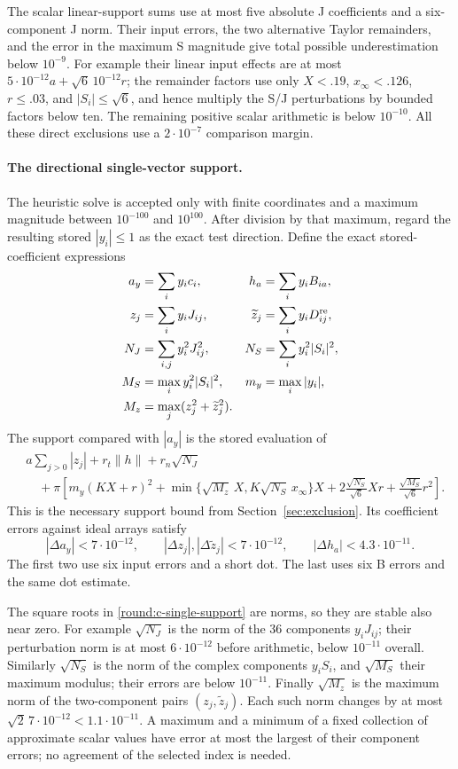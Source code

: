 The scalar linear-support sums use at most five absolute J
coefficients and a six-component J norm.
Their input errors, the two alternative Taylor remainders, and
the error in the maximum S magnitude give total possible
underestimation below $10^{-9}$.
For example their linear input effects are at most
$5\cdot10^{-12}a+\sqrt6\,10^{-12}r$; the remainder factors
use only $X<.19$, $x_\infty<.126$, $r\le.03$, and
$|S_i|\le\sqrt6$, and hence multiply the S/J perturbations by
bounded factors below ten.
The remaining positive scalar arithmetic is below $10^{-10}$.
All these direct exclusions use a $2\cdot10^{-7}$ comparison margin.

\paragraph{The directional single-vector support.}
The heuristic solve is accepted only with finite coordinates and a
maximum magnitude between $10^{-100}$ and $10^{100}$.
After division by that maximum, regard the resulting stored
$|y_i|\le1$ as the exact test direction.
Define the exact stored-coefficient expressions
\[
 \begin{aligned}
 a_y&=\sum_i y_i c_i,& h_a&=\sum_i y_iB_{ia},\\
 z_j&=\sum_i y_iJ_{ij},&
 \widetilde z_j&=\sum_i y_iD_{ij}^{\rm re},\\
 N_J&=\sum_{i,j}y_i^2J_{ij}^2,& N_S&=\sum_i y_i^2|S_i|^2,\\
 M_S&=\max_i y_i^2|S_i|^2,& m_y&=\max_i|y_i|,\\
 M_z&=\max_j(z_j^2+\widetilde z_j^2).
 \end{aligned}
\]
The support compared with $|a_y|$ is the stored evaluation of
\begin{align}
 &a\sum_{j>0}|z_j|+r_t\|h\|+r_n\sqrt{N_J}\nonumber\\
 &\quad+\pi\left[
 m_y(KX+r)^2+
 \min\{\sqrt{M_z}\,X,K\sqrt{N_S}\,x_\infty\}X
 +2\frac{\sqrt{N_S}}{\sqrt6}Xr
 +\frac{\sqrt{M_S}}{\sqrt6}r^2
 \right].\label{round:c-single-support}
\end{align}
This is the necessary support bound from
Section~\ref{sec:exclusion}.
Its coefficient errors against ideal arrays satisfy
\[
 |\Delta a_y|<7\cdot10^{-12},\qquad
 |\Delta z_j|,|\Delta\widetilde z_j|<7\cdot10^{-12},\qquad
 |\Delta h_a|<4.3\cdot10^{-11}.
 \]
The first two use six input errors and a short dot.
The last uses six B errors and the same dot estimate.

The square roots in \eqref{round:c-single-support} are norms, so
they are stable also near zero.
For example $\sqrt{N_J}$ is the norm of the 36 components
$y_iJ_{ij}$; their perturbation norm is at most
$6\cdot10^{-12}$ before arithmetic, below $10^{-11}$ overall.
Similarly $\sqrt{N_S}$ is the norm of the complex components
$y_iS_i$, and $\sqrt{M_S}$ their maximum modulus; their errors are
below $10^{-11}$.
Finally $\sqrt{M_z}$ is the maximum norm of the two-component pairs
$(z_j,\widetilde z_j)$.
Each such norm changes by at most
$\sqrt2\,7\cdot10^{-12}<1.1\cdot10^{-11}$.
A maximum and a minimum of a fixed collection of approximate scalar
values have error at most the largest of their component errors;
no agreement of the selected index is needed.

